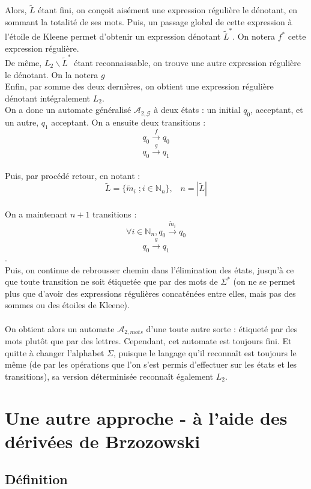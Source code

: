 \documentclass{article}
\begin{document}
Alors, $\tilde{L}$ étant fini, on conçoit aisément une expression régulière le dénotant, en sommant la totalité de ses mots. Puis, un passage global de cette expression à l'étoile de Kleene permet d'obtenir un expression dénotant $\tilde{L}^*$. On notera $f^*$ cette expression régulière.
\\
De même, $L_2 \backslash \tilde{L}^*$ étant reconnaissable, on trouve une autre expression régulière le dénotant. On la notera $g$
\\
Enfin, par somme des deux dernières, on obtient une expression régulière dénotant intégralement $L_2$.
\\
On a donc un automate généralisé $\mathcal{A}_{2,\mathcal{G}}$ à deux états : un initial $q_0$, acceptant, et un autre, $q_1$ acceptant. On a ensuite deux transitions :
$$q_0 \overset{f}{\longrightarrow} q_0$$
$$q_0 \overset{g}{\longrightarrow} q_1$$
\\
Puis, par procédé retour, en notant :
$$\tilde{L} = \{ \tilde{m}_i \; ; i \in \mathbb{N}_n\}, \;\;\; n = |\tilde{L}|$$
\\
On a maintenant $n+1$ transitions :
$$\forall i \in \mathbb{N}_n, q_0 \overset{\tilde{m}_i}{\longrightarrow} q_0$$
$$q_0 \overset{g}{\longrightarrow} q_1$$.
\\
Puis, on continue de rebrousser chemin dans l'élimination des états, jusqu'à ce que toute transition ne soit étiquetée que par des mots de $\Sigma^*$ (on ne se permet plus que d'avoir des expressions régulières concaténées entre elles, mais pas des sommes ou des étoiles de Kleene).
\\
\\
On obtient alors un automate $\mathcal{A}_{2,mots}$ d'une toute autre sorte : étiqueté par des mots plutôt que par des lettres. Cependant, cet automate est toujours fini. Et quitte à changer l'alphabet $\Sigma$, puisque le langage qu'il reconnaît est toujours le même (de par les opérations que l'on s'est permis d'effectuer sur les états et les transitions), sa version déterminisée reconnaît également $L_2$.
\\
\section{Une autre approche - à l'aide des dérivées de Brzozowski}

\subsection{Définition}
\end{document}

